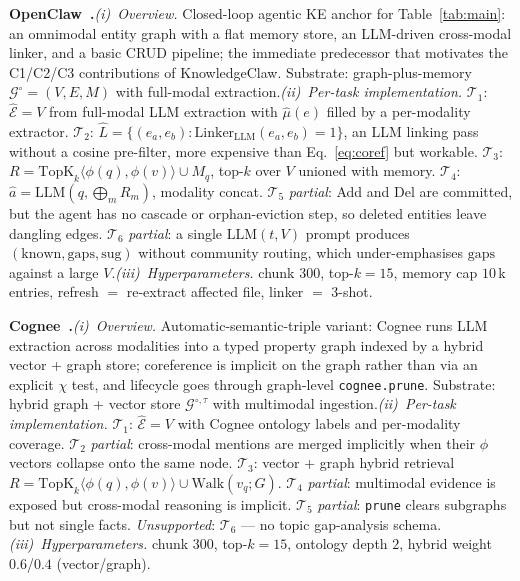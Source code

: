 \documentclass{article}
\begin{document}
\noindent\textbf{OpenClaw~\citep{OpenClaw}.}\quad\emph{(i)~Overview.} Closed-loop agentic KE anchor for Table~\ref{tab:main}: an omnimodal entity graph with a flat memory store, an LLM-driven cross-modal linker, and a basic CRUD pipeline; the immediate predecessor that motivates the C1/C2/C3 contributions of KnowledgeClaw. Substrate: graph-plus-memory $\mathcal{G}^{\circ}\!=\!(V,E,M)$ with full-modal extraction.\quad\emph{(ii)~Per-task implementation.} $\mathcal{T}_1$: $\hat{\mathcal{E}}\!=\!V$ from full-modal LLM extraction with $\hat{\mu}(e)$ filled by a per-modality extractor. $\mathcal{T}_2$: $\hat{L}\!=\!\{(e_a,e_b)\!:\!\mathrm{Linker}_{\mathrm{LLM}}(e_a,e_b)\!=\!1\}$, an LLM linking pass without a cosine pre-filter, more expensive than Eq.~\eqref{eq:coref} but workable. $\mathcal{T}_3$: $R\!=\!\mathrm{TopK}_{k}\!\langle\phi(q),\phi(v)\rangle\!\cup\!M_q$, top-$k$ over $V$ unioned with memory. $\mathcal{T}_4$: $\hat{a}\!=\!\mathrm{LLM}(q,\bigoplus_m R_m)$, modality concat. $\mathcal{T}_5$ \emph{partial}: Add and Del are committed, but the agent has no cascade or orphan-eviction step, so deleted entities leave dangling edges. $\mathcal{T}_6$ \emph{partial}: a single $\mathrm{LLM}(t,V)$ prompt produces $(\mathrm{known},\mathrm{gaps},\mathrm{sug})$ without community routing, which under-emphasises $\mathrm{gaps}$ against a large $V$.\quad\emph{(iii)~Hyperparameters.} chunk $300$, top-$k\!=\!15$, memory cap $10$\,k entries, refresh $=$ re-extract affected file, linker $=$ $3$-shot.

\noindent\textbf{Cognee~\citep{Cognee}.}\quad\emph{(i)~Overview.} Automatic-semantic-triple variant: Cognee runs LLM extraction across modalities into a typed property graph indexed by a hybrid vector + graph store; coreference is implicit on the graph rather than via an explicit $\chi$ test, and lifecycle goes through graph-level \texttt{cognee.prune}. Substrate: hybrid graph + vector store $\mathcal{G}^{\circ,\tau}$ with multimodal ingestion.\quad\emph{(ii)~Per-task implementation.} $\mathcal{T}_1$: $\hat{\mathcal{E}}\!=\!V$ with Cognee ontology labels and per-modality coverage. $\mathcal{T}_2$ \emph{partial}: cross-modal mentions are merged implicitly when their $\phi$ vectors collapse onto the same node. $\mathcal{T}_3$: vector + graph hybrid retrieval $R\!=\!\mathrm{TopK}_{k}\!\langle\phi(q),\phi(v)\rangle\!\cup\!\mathrm{Walk}(v_q;G)$. $\mathcal{T}_4$ \emph{partial}: multimodal evidence is exposed but cross-modal reasoning is implicit. $\mathcal{T}_5$ \emph{partial}: \texttt{prune} clears subgraphs but not single facts. \emph{Unsupported}: $\mathcal{T}_6$ — no topic gap-analysis schema.\quad\emph{(iii)~Hyperparameters.} chunk $300$, top-$k\!=\!15$, ontology depth $2$, hybrid weight $0.6$/$0.4$ (vector/graph).
\end{document}
